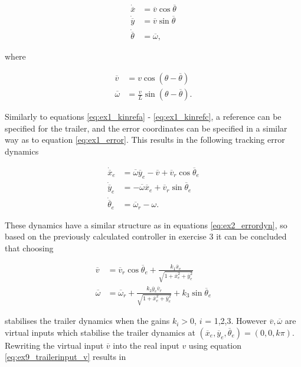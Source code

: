 \begin{align}
    \dot{\overline{x}} &= \overline{v} \cos{\overline{\theta}} \label{eq:ex9_trailerkinematic_a}\\
    \dot{\overline{y}} &= \overline{v} \sin{\overline{\theta}} \label{eq:ex9_trailerkinematic_b}\\
    \dot{\overline{\theta}} &= \overline{\omega},
    \label{eq:ex9_trailerkinematic_c}
\end{align}

where

\begin{align}
    \overline{v} &= v\cos(\theta-\overline{\theta}) \label{eq:ex9_trailerinput_v}\\
    \overline{\omega} &= \frac{v}{L}\sin(\theta-\overline{\theta}).
    \label{eq:ex9_trailerinput_w}
\end{align}

Similarly to equations \eqref{eq:ex1_kinrefa} - \eqref{eq:ex1_kinrefc}, a reference can be specified for the trailer, and the error coordinates can be specified in a similar way as to equation \eqref{eq:ex1_error}. This results in the following tracking error dynamics

\begin{align}
    \dot{\overline{x}}_e &= \overline{\omega}\overline{y}_e - \overline{v} + \overline{v}_r\cos\overline{\theta}_e \label{eq:ex9_error_a} \\
    \dot{\overline{y}}_e &= -\overline{\omega} \overline{x}_e  + \overline{v}_r\sin\overline{\theta}_e \label{eq:ex9_error_b} \\
    \dot{\overline{\theta}}_e &= \overline{\omega}_r - \omega \label{eq:ex9_error_c}.
\end{align}

These dynamics have a similar structure as in equations \eqref{eq:ex2_errordyn}, so based on the previously calculated controller in exercise 3 it can be concluded that choosing 

\begin{align}
    \overline{v} &= \overline{v}_r\cos\overline{\theta}_e + \frac{k_1\overline{x}_e}{\sqrt{1+\overline{x}^2_e+\overline{y}^2_e}} \label{eq:ex9_virtualinput_v}\\
    \overline{\omega} &= \overline{\omega}_r + \frac{k_2\overline{y}_e\overline{v}_r}{\sqrt{1+\overline{x}^2_e+\overline{y}^2_e}} + k_3\sin\overline{\theta}_e \label{eq:ex9_virtualinput_w}
\end{align}

stabilises the trailer dynamics when the gains $k_i > 0$, $i$ = 1,2,3. However $\overline{v}, \overline{\omega}$ are virtual inputs which stabilise the trailer dynamics at $(\overline{x}_e,\overline{y}_e,\overline{\theta}_e) = (0,0,k\pi)$. Rewriting the virtual input $\overline{v}$ into the real input $v$ using equation \eqref{eq:ex9_trailerinput_v} results in 

